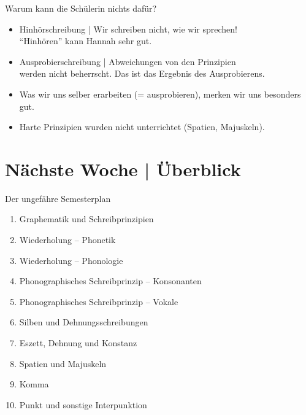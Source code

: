 \begin{frame}
  {Warum kann die Schülerin nichts dafür?}
  \begin{itemize}[<+->]
    \item \alert{Hinhörschreibung} | Wir schreiben nicht, wie wir sprechen!\\
      "`Hinhören"' kann Hannah sehr gut.
      \Zeile
    \item \alert{Ausprobierschreibung} | \alert{Abweichungen von den Prinzipien}\\
      werden nicht beherrscht. Das ist das Ergebnis des Ausprobierens.
    \item Was wir uns selber erarbeiten (= ausprobieren), merken wir uns besonders gut.
      \Zeile
    \item Harte Prinzipien wurden nicht unterrichtet (Spatien, Majuskeln).
  \end{itemize}
\end{frame}

\ifdefined\TITLE
  \section{Nächste Woche | Überblick}

  \begin{frame}
    {Der ungefähre Semesterplan}
    \begin{enumerate}[<+->]
      \item Graphematik und Schreibprinzipien
      \item \alert{Wiederholung -- Phonetik}
      \item Wiederholung -- Phonologie
      \item Phonographisches Schreibprinzip -- Konsonanten
      \item Phonographisches Schreibprinzip -- Vokale
      \item Silben und Dehnungsschreibungen
      \item Eszett, Dehnung und Konstanz
      \item Spatien und Majuskeln
      \item Komma
      \item Punkt und sonstige Interpunktion
    \end{enumerate}
  \end{frame}
\fi
